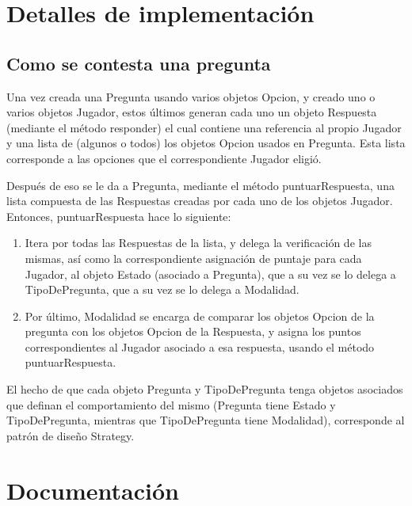 \documentclass[titlepage,a4paper]{article}
\begin{document}
\section{Detalles de implementación}

\subsection{Como se contesta una pregunta}

Una vez creada una Pregunta usando varios objetos Opcion, y creado uno o varios objetos Jugador, estos últimos generan cada uno un objeto Respuesta (mediante el método responder) el cual contiene una referencia al propio Jugador y una lista de (algunos o todos) los objetos Opcion usados en Pregunta. Esta lista corresponde a las opciones que el correspondiente Jugador eligió.

Después de eso se le da a Pregunta, mediante el método puntuarRespuesta, una lista compuesta de las Respuestas creadas por cada uno de los objetos Jugador. Entonces, puntuarRespuesta hace lo siguiente:
\begin{enumerate}
\item Itera por todas las Respuestas de la lista, y delega la verificación de las mismas, así como la correspondiente asignación de puntaje para cada Jugador, al objeto Estado (asociado a Pregunta), que a su vez se lo delega a TipoDePregunta, que a su vez se lo delega a Modalidad.
\item Por último, Modalidad se encarga de comparar los objetos Opcion de la pregunta con los objetos Opcion de la Respuesta, y asigna los puntos correspondientes al Jugador asociado a esa respuesta, usando el método puntuarRespuesta.
\end{enumerate}

El hecho de que cada objeto Pregunta y TipoDePregunta tenga objetos asociados que definan el comportamiento del mismo (Pregunta tiene Estado y TipoDePregunta, mientras que TipoDePregunta tiene Modalidad), corresponde al patrón de diseño Strategy.


\section{Documentación}
\end{document}
